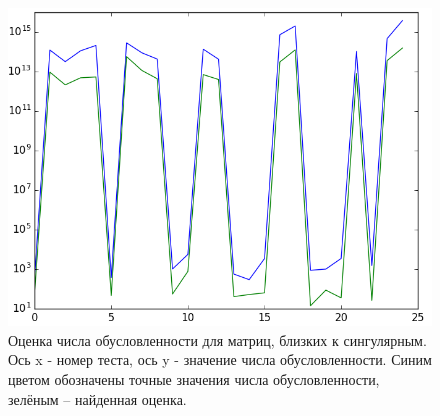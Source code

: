 \begin{figure}[ht]
\includegraphics[width=\textwidth,height=\textheight,keepaspectratio]{figure_4_cropped}
\caption{Оценка числа обусловленности для матриц, близких к сингулярным. Ось x - номер теста, ось y - значение числа обусловленности. Синим цветом обозначены точные значения числа обусловленности, зелёным – найденная оценка.}
\end{figure}


